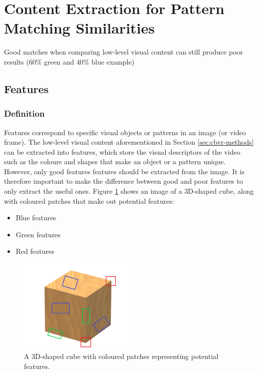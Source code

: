 \documentclass[11pt,openany,a4paper]{article}
\begin{document}
\clearpage \section{Content Extraction for Pattern Matching Similarities}

Good matches when comparing low-level visual content can still produce poor results (60\% green and 40\% blue example) \cite{petkovic2000}

\subsection{Features}
\label{sec:features}

\subsubsection{Definition}
\label{sec:feature-definition}

Features correspond to specific visual objects or patterns in an image (or video frame). The low-level visual content aforementioned in Section \ref{sec:cbvr-methods} can be extracted into features, which store the visual descriptors of the video such as the colours and shapes \cite{petkovic2000} that make an object or a pattern unique. However, only good features features should be extracted from the image. It is therefore important to make the difference between good and poor features to only extract the useful ones. Figure \ref{fig:features_cube} shows an image of a 3D-shaped cube, along with coloured patches that make out potential features:
\begin{itemize}
	\item Blue features
	\item Green features
	\item Red features
\end{itemize}

\begin{figure}[h]
\centerline{\includegraphics[width=0.5\textwidth]{figures/features_cube.png}}
\caption{\label{fig:features_cube}A 3D-shaped cube with coloured patches representing potential features.}
\end{figure}
\end{document}
